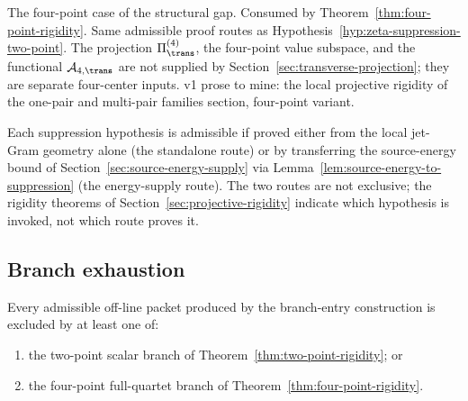 \begin{wip}\label{rem:wip-zeta-suppression-four-point}
The four-point case of the structural gap.  Consumed by
Theorem~\ref{thm:four-point-rigidity}.  Same admissible proof routes
as Hypothesis~\ref{hyp:zeta-suppression-two-point}.  The projection
\(\Pi_\trans^{(4)}\), the four-point value subspace, and the
functional \(\mathcal A_{4,\trans}\) are not supplied by
Section~\ref{sec:transverse-projection}; they are separate
four-center inputs.  v1 prose to mine: the local projective rigidity
of the one-pair and multi-pair families section, four-point variant.
\end{wip}

\begin{remark}
\label{rem:zeta-suppression-routes}
Each suppression hypothesis is admissible if proved either from the
local jet-Gram geometry alone (the standalone route) or by
transferring the source-energy bound of
Section~\ref{sec:source-energy-supply} via
Lemma~\ref{lem:source-energy-to-suppression} (the energy-supply
route).  The two routes are not exclusive; the rigidity theorems of
Section~\ref{sec:projective-rigidity} indicate which hypothesis is
invoked, not which route proves it.
\end{remark}


\subsection{Branch exhaustion}
\label{subsec:branch-exhaustion}

\begin{hypothesis}
\label{hyp:branch-exhaustion}
Every admissible off-line packet produced by the branch-entry
construction is excluded by at least one of:
\begin{enumerate}[label=\textup{(\roman*)},leftmargin=*]
\item the two-point scalar branch of
      Theorem~\ref{thm:two-point-rigidity}; or
\item the four-point full-quartet branch of
      Theorem~\ref{thm:four-point-rigidity}.
\end{enumerate}
\end{hypothesis}

